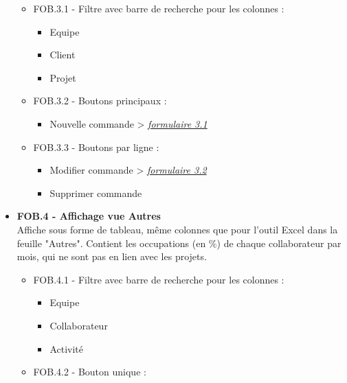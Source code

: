 \documentclass[french]{report}
\begin{document}
\begin{itemize}[label=\textbullet, font=\normalfont \color{blue}]
\begin{itemize}[label=\textbullet]
    \item{FOB.3.1 - Filtre avec barre de recherche pour les colonnes :}

    \begin{itemize}[label=-]
      \item{Equipe}
      \item{Client}
      \item{Projet}
    \end{itemize}

    \item{FOB.3.2 - Boutons principaux :}

    \begin{itemize}[label=-]
      \item{Nouvelle commande} > \hyperref[sec:3.1]{\emph{formulaire 3.1}}
    \end{itemize}

    \item{FOB.3.3 - Boutons par ligne :}

    \begin{itemize}[label=-]
      \item{Modifier commande} > \hyperref[sec:3.2]{\emph{formulaire 3.2}}
      \item{Supprimer commande}
    \end{itemize}

  \end{itemize}

  \item{\textbf{FOB.4 - Affichage vue Autres}}\\
Affiche sous forme de tableau, même colonnes que pour l’outil Excel dans la
feuille "Autres". Contient les occupations (en \%) de chaque collaborateur par
mois, qui ne sont pas en lien avec les projets.

\begin{itemize}[label=\textbullet]
  \item{FOB.4.1 - Filtre avec barre de recherche pour les colonnes :}

  \begin{itemize}[label=-]
    \item{Equipe}
    \item{Collaborateur}
    \item{Activité}
  \end{itemize}

  \item{FOB.4.2 - Bouton unique :}


\end{itemize}
\end{itemize}
\end{document}
